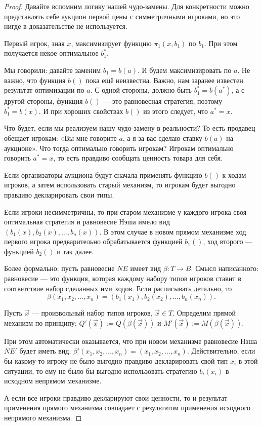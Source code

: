 \begin{proof}
Давайте вспомним логику нашей чудо-замены. Для конкретности можно представлять себе аукцион первой цены с симметричными игроками, но это нигде в доказательстве не используется.

Первый игрок, зная $ x $, максимизирует функцию $ \pi_{1}(x,b_{1}) $ по $ b_{1} $. При этом получается некое оптимальное $ b_{1}^{*} $.

Мы говорили: давайте заменим $ b_{1}=b(a) $. И будем максимизировать по $ a $. Не важно, что функция $ b() $ пока ещё неизвестна. Важно, нам заранее известен результат оптимизации по $ a $. С одной стороны, должно быть $ b_{1}^{*}=b(a^{*})$, а с другой стороны, функция $ b() $ — это равновесная стратегия, поэтому $ b_{1}^{*}=b(x) $. И при хороших свойствах $ b() $ из этого следует, что  $ a^{*}=x $.

Что будет, если мы реализуем нашу чудо-замену в реальности? То есть продавец обещает игрокам: «Вы мне говорите $ a $, а я за вас сделаю ставку $ b(a) $ на аукционе». Что тогда оптимально говорить игрокам? Игрокам оптимально говорить $ a^{*}=x $, то есть правдиво сообщать ценность товара для себя.

Если организаторы аукциона будут сначала применять функцию $ b() $ к ходам игроков, а затем использовать старый механизм, то игрокам будет выгодно правдиво декларировать свои типы.



Если игроки несимметричны, то при старом механизме у каждого игрока своя оптимальная стратегия и равновесие Нэша имело вид $ (b_{1}(x),b_{2}(x),\ldots,b_{n}(x)) $. В этом случае в новом прямом механизме ход первого игрока предварительно обрабатывается функцией $ b_{1}() $, ход второго — функцией $ b_{2}() $ и так далее.

Более формально: пусть равновесие $ NE $ имеет вид $ \beta: T\to B $. Смысл написанного: равновесие — это функция, которая каждому набору типов игроков ставит в соответствие набор сделанных ими ходов. Если расписывать детально, то
\[
\beta(x_{1},x_{2},\ldots,x_{n})=(b_{1}(x_{1}),b_{2}(x_{2}),\ldots,b_{n}(x_{n})).
\]

Пусть $ \vec{x} $ — произвольный набор типов игроков, $ \vec{x}\in T $. Определим прямой механизм по принципу: $ Q'(\vec{x}):=Q(\beta(\vec{x})) $ и
$ M'(\vec{x}):=M(\beta(\vec{x}))  $.

При этом автоматически оказывается, что при новом механизме равновесие Нэша $ NE' $ будет иметь вид: $ \beta'(x_{1},x_{2},\ldots,x_{n})=(x_{1},x_{2},\ldots,x_{n}) $. Действительно, если бы какому-то игроку  не было выгодно правдиво декларировать свой тип $ x_{i} $ в этой ситуации, то ему не было бы выгодно использовать стратегию $ b_{i}(x_{i}) $ в исходном непрямом механизме.

А если все игроки правдиво декларируют свои ценности, то и результат применения прямого механизма совпадает с результатом применения исходного непрямого механизма.
\end{proof}

